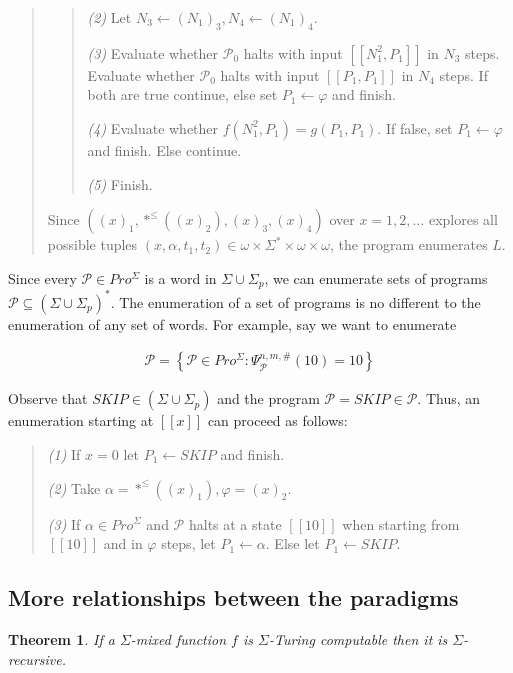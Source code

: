 \documentclass[a4paper, 12pt]{article}
\newtheorem{theorem}{Theorem}
\newtheorem{theorem}{Theorem}
\begin{document}
\begin{quote}
\begin{quote}
    \textit{(2)} Let $N_3 \leftarrow (N_1)_3, N_4 \leftarrow (N_1)_4$.

    \textit{(3)} Evaluate whether $\mathcal{P}_0$ halts with input $[\![ N_1^2,
    P_1]\!]$ in $N_3$ steps. Evaluate whether $\mathcal{P}_0$ halts with input
    $[\![ P_1, P_1 ]\!]$ in $N_4$ steps. If both are true continue, else
    set $P_1 \leftarrow \varphi$ and finish.

    \textit{(4)} Evaluate whether $f( N_1^2 , P_1 ) = g(P_1, P_1)$. If false,
    set $P_1 \leftarrow \varphi$ and finish. Else continue. 

    \textit{(5)} Finish.
\end{quote}

Since $\left( (x)_1, *^{\leq} \left( (x)_2 \right), (x)_3, (x)_4  \right) $ over
$x = 1, 2, \ldots$ explores all possible tuples $(x, \alpha, t_1, t_2) \in
\omega \times \Sigma^{*} \times \omega \times \omega$, the program enumerates
$L$.

\end{quote}
\normalsize

Since every $\mathcal{P} \in Pro^{\Sigma}$ is a word in $\Sigma \cup \Sigma_p$,
we can enumerate sets of programs $\mathscr{P} \subseteq (\Sigma \cup
\Sigma_p)^{*}$. The enumeration of a set of programs is no different to the
enumeration of any set of words. For example, say we want to enumerate 

\begin{align*}
    \mathscr{P} = \left\{ \mathcal{P} \in Pro^{\Sigma} : \Psi_{\mathcal{P}}^{n,
    m, \#}(10) = 10 \right\} 
\end{align*}

Observe that $SKIP \in (\Sigma \cup \Sigma_p)$ and the program $\mathcal{P} =
SKIP \in \mathscr{P}$. Thus, an enumeration starting at $[\![ x ]\!]$ can
proceed as follows:

\begin{quote}
    \textit{(1)} If $x = 0$ let $P_1 \leftarrow SKIP$ and finish. 

    \textit{(2)} Take $\alpha = *^{\leq} \left( (x)_1 \right), \varphi = (x)_2 $.  

    \textit{(3)} If $\alpha \in Pro^{\Sigma}$ and $\mathcal{P}$ halts at a state
    $[\![ 10 ]\!]$ when starting from $[\![ 10 ]\!]$ and in $\varphi$ steps,
    let $P_1 \leftarrow \alpha$. Else let $P_1 \leftarrow  SKIP$.
\end{quote}

\subsection{More relationships between the paradigms}

\begin{theorem}
    If a $\Sigma$-mixed function $f$ is $\Sigma$-Turing computable then it is
    $\Sigma$-recursive.
\end{theorem}
\end{document}
